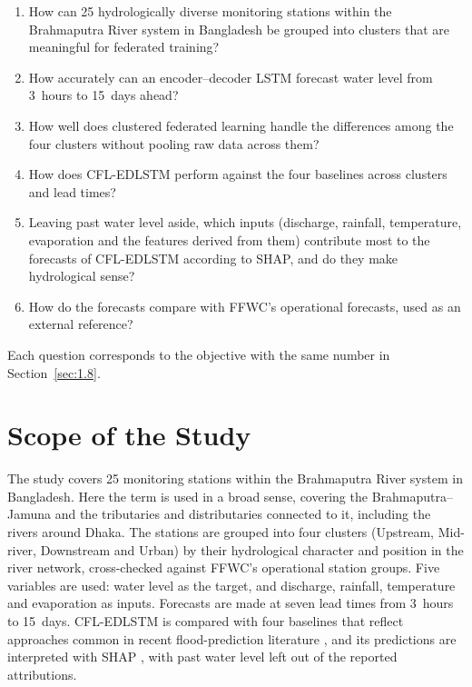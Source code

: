\begin{enumerate}
    \item How can 25 hydrologically diverse monitoring stations within the
    Brahmaputra River system in Bangladesh be grouped into clusters that are
    meaningful for federated training?

    \item How accurately can an encoder--decoder LSTM forecast water level from
    3~hours to 15~days ahead?

    \item How well does clustered federated learning handle the differences
    among the four clusters without pooling raw data across them?

    \item How does CFL-EDLSTM perform against the four baselines across
    clusters and lead times?

    \item Leaving past water level aside, which inputs (discharge, rainfall,
    temperature, evaporation and the features derived from them) contribute
    most to the forecasts of CFL-EDLSTM according to SHAP, and do they make
    hydrological sense?

    \item How do the forecasts compare with FFWC's operational forecasts, used
    as an external reference?
\end{enumerate}

Each question corresponds to the objective with the same number in
Section~\ref{sec:1.8}.

\section{Scope of the Study}
\label{sec:1.10}

The study covers 25 monitoring stations within the Brahmaputra River system in
Bangladesh. Here the term is used in a broad sense, covering the
Brahmaputra--Jamuna and the tributaries and distributaries connected to it,
including the rivers around Dhaka. The stations are grouped into four clusters
(Upstream, Mid-river, Downstream and Urban) by their hydrological character and
position in the river network, cross-checked against FFWC's operational station
groups. Five variables are used: water level as the target, and discharge,
rainfall, temperature and evaporation as inputs. Forecasts are made at seven
lead times from 3~hours to 15~days. CFL-EDLSTM is compared with four baselines
that reflect approaches common in recent flood-prediction literature
\cite{Aghenda2025}, and its predictions are interpreted with SHAP
\cite{Lundberg2017,Huang2024}, with past water level left out of the reported
attributions.

